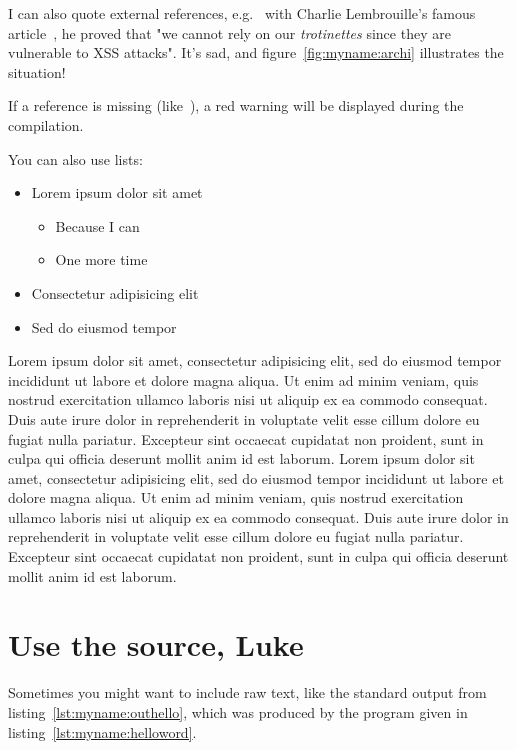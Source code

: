 
I can also quote external references, e.g.~ with Charlie Lembrouille's
famous article~\cite{myname:charlielembrouille}, he proved that "we
cannot rely on our \emph{trotinettes} since they are vulnerable to XSS
attacks". It's sad, and figure~\ref{fig:myname:archi} illustrates the
situation!

If a reference is missing (like~\cite{myname:referencefoireuse}), a
red warning will be displayed during the compilation.



You can also use lists:
\begin{itemize}
\item Lorem ipsum dolor sit amet
  \begin{itemize}
  \item Because I can
  \item One more time
  \end{itemize}
\item Consectetur adipisicing elit
\item Sed do eiusmod tempor
\end{itemize}

Lorem ipsum dolor sit amet, consectetur adipisicing elit, sed do
eiusmod tempor incididunt ut labore et dolore magna aliqua. Ut enim ad
minim veniam, quis nostrud exercitation ullamco laboris nisi ut
aliquip ex ea commodo consequat. Duis aute irure dolor in
reprehenderit in voluptate velit esse cillum dolore eu fugiat nulla
pariatur. Excepteur sint occaecat cupidatat non proident, sunt in
culpa qui officia deserunt mollit anim id est laborum. Lorem ipsum
dolor sit amet, consectetur adipisicing elit, sed do eiusmod tempor
incididunt ut labore et dolore magna aliqua. Ut enim ad minim veniam,
quis nostrud exercitation ullamco laboris nisi ut aliquip ex ea
commodo consequat. Duis aute irure dolor in reprehenderit in voluptate
velit esse cillum dolore eu fugiat nulla pariatur. Excepteur sint
occaecat cupidatat non proident, sunt in culpa qui officia deserunt
mollit anim id est laborum.

\section{Use the source, Luke}


Sometimes you might want to include raw text, like the standard output
from listing~\ref{lst:myname:outhello}, which was produced by the
program given in listing~\ref{lst:myname:helloword}.

